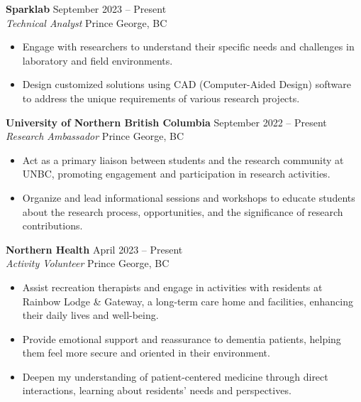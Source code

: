 \documentclass[11pt]{article}
\begin{document}
\vspace{8pt}

\noindent\textbf{Sparklab} \hfill September 2023 – Present \\
\textit{Technical Analyst} \hfill Prince George, BC
\begin{itemize}[leftmargin=*, topsep=2pt, itemsep=1pt, parsep=0pt]
\item Engage with researchers to understand their specific needs and challenges in laboratory and field environments.
\item Design customized solutions using CAD (Computer-Aided Design) software to address the unique requirements of various research projects.
\end{itemize}

\vspace{8pt}

\noindent\textbf{University of Northern British Columbia} \hfill September 2022 – Present \\
\textit{Research Ambassador} \hfill Prince George, BC
\begin{itemize}[leftmargin=*, topsep=2pt, itemsep=1pt, parsep=0pt]
\item Act as a primary liaison between students and the research community at UNBC, promoting engagement and participation in research activities.
\item Organize and lead informational sessions and workshops to educate students about the research process, opportunities, and the significance of research contributions.
\end{itemize}

\vspace{8pt}

\noindent\textbf{Northern Health} \hfill April 2023 – Present \\
\textit{Activity Volunteer} \hfill Prince George, BC
\begin{itemize}[leftmargin=*, topsep=2pt, itemsep=1pt, parsep=0pt]
\item Assist recreation therapists and engage in activities with residents at Rainbow Lodge \& Gateway, a long-term care home and facilities, enhancing their daily lives and well-being.
\item Provide emotional support and reassurance to dementia patients, helping them feel more secure and oriented in their environment.
\item Deepen my understanding of patient-centered medicine through direct interactions, learning about residents' needs and perspectives.
\end{itemize}
\end{document}
